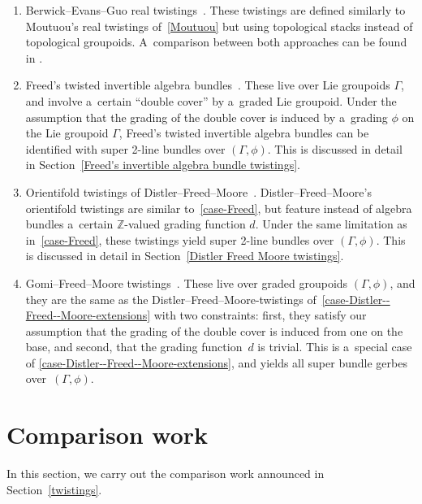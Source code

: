 \documentclass[pdftex]{sigma}
\numberwithin{equation}{section}
\def\Z {\mathbb{Z}}
\begin{document}
\begin{enumerate}[(1)]
\item
Berwick--Evans--Guo real twistings~\cite{BerwickEvans2024}.
These twistings are defined similarly to Moutuou's real twistings of~\ref{Moutuou} but using topological stacks instead of topological groupoids. A~comparison between both approaches can be found in \cite[Sections~3.4 and~3.5]{BerwickEvans2024}.

\item
\label{case-Freed}
Freed's twisted invertible algebra bundles~\cite{Freed2012a}.
These live over Lie groupoids $\Gamma$, and involve a~certain ``double cover'' by a~graded Lie groupoid. Under the assumption that the grading of the double cover is induced by a~grading $\phi$ on the Lie groupoid $\Gamma$,
Freed's twisted invertible algebra bundles can be identified with super 2-line bundles over $(\Gamma,\phi)$. This is discussed in detail in Section~\ref{Freed's invertible algebra bundle twistings}.

\item
\label{case-Distler--Freed--Moore-extensions}
Orientifold twistings of Distler--Freed--Moore~\cite{Distler2011,distler2010spin,Freed2009Slides}.
Distler--Freed--Moore's orientifold twistings are similar to~\ref{case-Freed}, but feature instead of algebra bundles a~certain $\Z$-valued grading function $d$. Under the same limitation as in~\ref{case-Freed},
these twistings yield super 2-line bundles over $(\Gamma,\phi)$. This is discussed in detail in Section~\ref{Distler Freed Moore twistings}.

\item
Gomi--Freed--Moore twistings~\cite{gomi2021freedmoorektheory}.
These live over graded groupoids $(\Gamma,\phi)$, and they are the same as the Distler--Freed--Moore-twistings of~\ref{case-Distler--Freed--Moore-extensions}
with two constraints: first, they satisfy our assumption that the grading of the double cover is induced from one on the base, and second, that the grading function~$d$ is trivial. This is a~special case of
\ref{case-Distler--Freed--Moore-extensions}, and yields all super bundle gerbes over~$(\Gamma,\phi)$.
\end{enumerate}

\section{Comparison work}\label{section-comparison-work}

In this section, we carry out the comparison work announced in Section~\ref{twistings}.
\end{document}
